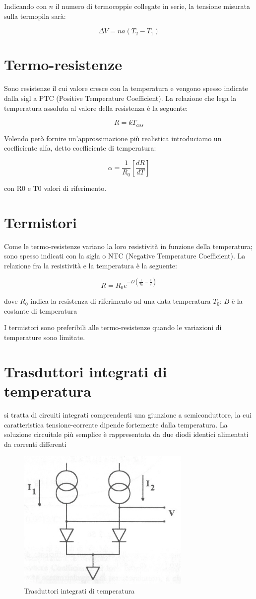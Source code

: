Indicando con $n$ il numero di termocoppie collegate in serie, la
tensione misurata sulla termopila sarà:

	\[\Delta V = na(T_2 -T_1)\]

\section{Termo-resistenze}
Sono resistenze il cui valore cresce con  la temperatura e vengono
spesso indicate dalla  sigl a PTC (Positive Temperature
Coefficient). La relazione  che lega la temperatura assoluta al
valore della resistenza è la seguente:

	\[R=kT_{ass}\]

Volendo però fornire un'approssimazione più realistica introduciamo un
coefficiente alfa, detto coefficiente di temperatura:

	\[\alpha=\frac{1}{R_0}[\frac{dR}{dT}]\]

con R0 e T0 valori di riferimento.

\section{Termistori}
Come le termo-resistenze variano la loro resistività in funzione
della temperatura; sono spesso indicati con la sigla o  NTC (Negative
Temperature Coefficient). La relazione fra la resistività e la
temperatura è la seguente:

	\[R=R_0e^{-D(\frac{1}{T_0}-\frac{1}{T})}\]

dove $R_0$ indica la resistenza di riferimento ad una data
temperatura $T_0$; $B$ è la costante di temperatura

I termistori sono preferibili alle termo-resistenze quando le
variazioni di temperature sono limitate.

\section{Trasduttori integrati di temperatura}
si tratta di circuiti integrati comprendenti una giunzione a
semiconduttore, la cui caratteristica tensione-corrente dipende
fortemente dalla temperatura. La soluzione circuitale più semplice è
rappresentata da due diodi identici alimentati da correnti differenti

\begin{figure}[htbp]
	\centering
	\includegraphics[scale=0.5]
			{img/termointegrati.png}
	\caption{Trasduttori integrati di temperatura
\label{fig:termointegrati}}
\end{figure}


